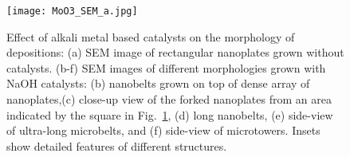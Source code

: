 \begin{figure}[htb]
\centering
\texttt{[image: MoO3\_SEM\_a.jpg]}
\caption[Effect of alkali metal based catalysts on  depositions]{Effect of alkali metal based catalysts on the morphology of  depositions: (a) SEM image of rectangular nanoplates grown without catalysts. (b-f) SEM images of different morphologies grown with NaOH catalysts: (b) nanobelts grown on top of dense array of nanoplates,(c) close-up view of the forked nanoplates from an area indicated by the square in Fig.~\ref{fig:ch4sem2by3}, (d) long nanobelts, (e) side-view of ultra-long microbelts, and (f) side-view of microtowers. Insets show detailed features of different  structures.}
\label{fig:ch4sem2by3}
\end{figure}

